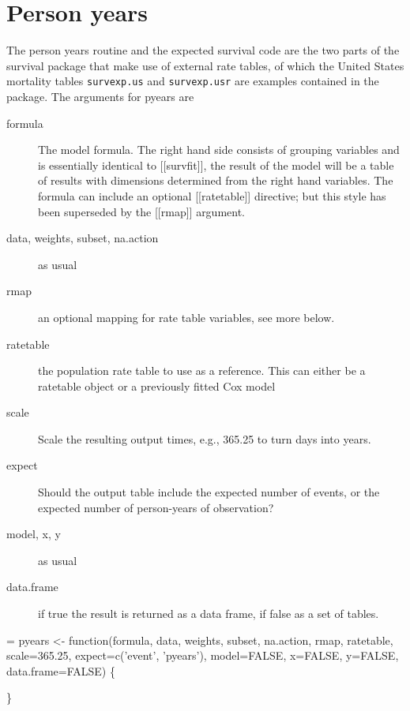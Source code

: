 \documentclass{article}
\newcommand{\code}[1]{\texttt{#1}}
\begin{document}
\section{Person years}
The person years routine and the expected survival code are the
two parts of the survival package that make use of external
rate tables, of which the United States mortality tables \code{survexp.us}
and \code{survexp.usr} are examples contained in the package.
The arguments for pyears are
\begin{description}
  \item[formula] The model formula. The right hand side consists of grouping
    variables and is essentially identical to [[survfit]], the result of the
    model will be a table of results with dimensions determined from the 
    right hand variables.  The formula can include an optional [[ratetable]]
    directive; but this style has been superseded by the [[rmap]] argument.
  \item [data, weights, subset, na.action] as usual
  \item[rmap] an optional mapping for rate table variables, see more below.
  \item[ratetable] the population rate table to use as a reference.  This can
    either be a ratetable object or a previously fitted Cox model
  \item[scale] Scale the resulting output times, e.g., 365.25 to turn days into
    years.
  \item[expect] Should the output table include the expected number of 
    events, or the expected number of person-years of observation?
  \item[model, x, y] as usual
  \item[data.frame] if true the result is returned as a data frame, if false
    as a set of tables.
\end{description}

\begin{nwchunk}
=
 pyears <- function(formula, data,
         weights, subset, na.action, rmap,
         ratetable, scale=365.25,  expect=c('event', 'pyears'),
         model=FALSE, x=FALSE, y=FALSE, data.frame=FALSE) \{
 
     \}
\end{nwchunk}
\end{document}
